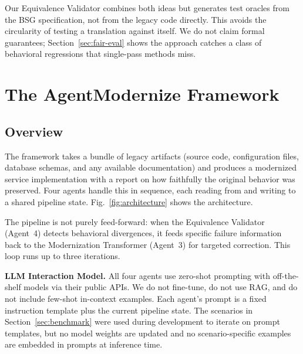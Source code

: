 \documentclass[conference]{IEEEtran}
\begin{document}
Our Equivalence Validator combines both ideas but generates test oracles from the BSG specification, not from the legacy code directly. This avoids the circularity of testing a translation against itself. We do not claim formal guarantees; Section~\ref{sec:fair-eval} shows the approach catches a class of behavioral regressions that single-pass methods miss.

\section{The AgentModernize Framework}

\subsection{Overview}

The framework takes a bundle of legacy artifacts (source code, configuration files, database schemas, and any available documentation) and produces a modernized service implementation with a report on how faithfully the original behavior was preserved. Four agents handle this in sequence, each reading from and writing to a shared pipeline state. Fig.~\ref{fig:architecture} shows the architecture.

The pipeline is not purely feed-forward: when the Equivalence Validator (Agent~4) detects behavioral divergences, it feeds specific failure information back to the Modernization Transformer (Agent~3) for targeted correction. This loop runs up to three iterations.

\textbf{LLM Interaction Model.} All four agents use zero-shot prompting with off-the-shelf models via their public APIs. We do not fine-tune, do not use RAG, and do not include few-shot in-context examples. Each agent's prompt is a fixed instruction template plus the current pipeline state. The scenarios in Section~\ref{sec:benchmark} were used during development to iterate on prompt templates, but no model weights are updated and no scenario-specific examples are embedded in prompts at inference time.
\end{document}
